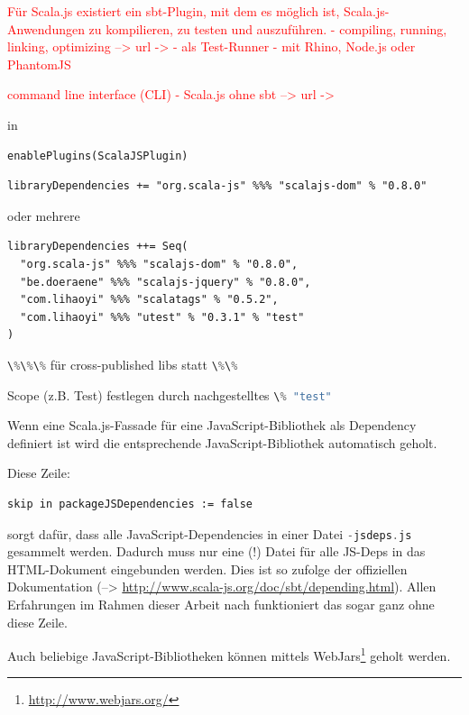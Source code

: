 \documentclass[a4paper, 12pt, hidelinks, listof=totoc, listoftables=totoc, bibliography=totoc]{scrreprt}
\newcommand{\code}[1]{\lstinline[language=Scala, style=inline]|#1|}
\newcommand{\TODO}[1]{\textcolor{red}{#1}\newline}
\begin{document}

\TODO{Für Scala.js existiert ein sbt-Plugin, mit dem es möglich ist, Scala.js-Anwendungen zu kompilieren, zu testen und auszuführen.}
\TODO{  - compiling, running, linking, optimizing --> url -> %
}
\TODO{  - als Test-Runner - mit Rhino, Node.js oder PhantomJS}

\TODO{command line interface (CLI)}
\TODO{  - Scala.js ohne sbt  -->  url -> %
}



in
\begin{lstlisting}[style=snippet]
enablePlugins(ScalaJSPlugin)
\end{lstlisting}

\begin{lstlisting}[style=snippet]
libraryDependencies += "org.scala-js" %%% "scalajs-dom" % "0.8.0"
\end{lstlisting}

oder mehrere

\begin{lstlisting}[style=snippet]
libraryDependencies ++= Seq(
  "org.scala-js" %%% "scalajs-dom" % "0.8.0",
  "be.doeraene" %%% "scalajs-jquery" % "0.8.0",
  "com.lihaoyi" %%% "scalatags" % "0.5.2",
  "com.lihaoyi" %%% "utest" % "0.3.1" % "test"
)
\end{lstlisting}

\code{\%\%\%} für cross-published libs statt \code{\%\%}

Scope (z.B. Test) festlegen durch nachgestelltes \code{\% "test"}

Wenn eine Scala.js-Fassade für eine JavaScript-Bibliothek als Dependency definiert ist wird die entsprechende JavaScript-Bibliothek automatisch geholt.


Diese Zeile:

\begin{lstlisting}[style=snippet]
skip in packageJSDependencies := false
\end{lstlisting}

sorgt dafür, dass alle JavaScript-Dependencies in einer Datei \code{-jsdeps.js} gesammelt werden. Dadurch muss nur eine (!) Datei für alle JS-Deps in das HTML-Dokument eingebunden werden. Dies ist so zufolge der offiziellen Dokumentation (-->  \url{http://www.scala-js.org/doc/sbt/depending.html}). Allen Erfahrungen im Rahmen dieser Arbeit nach funktioniert das sogar ganz ohne diese Zeile.

Auch beliebige JavaScript-Bibliotheken können mittels WebJars\footnote{\url{http://www.webjars.org/}} geholt werden.
\end{document}
